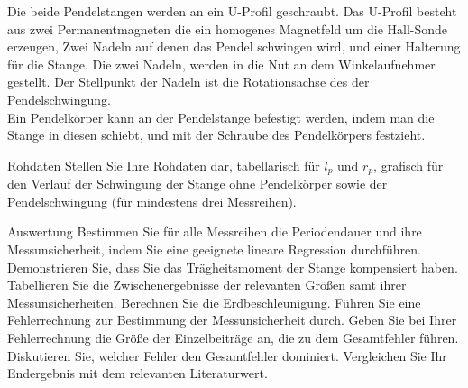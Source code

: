 \documentclass[twoside]{protokoll}
\begin{document}
Die beide Pendelstangen werden an ein U-Profil geschraubt.
Das U-Profil besteht aus zwei Permanentmagneten die ein homogenes Magnetfeld um die Hall-Sonde erzeugen, Zwei Nadeln auf denen das Pendel schwingen wird, und einer Halterung für die Stange. 
Die zwei Nadeln, werden in die Nut an dem Winkelaufnehmer gestellt.
Der Stellpunkt der Nadeln ist die Rotationsachse des der Pendelschwingung. \\

Ein Pendelkörper kann an der Pendelstange befestigt werden, indem man die Stange in diesen schiebt, und mit der Schraube des Pendelkörpers festzieht. 


\begin{aufgabe}{Rohdaten}
  Stellen Sie Ihre Rohdaten dar, tabellarisch für $l_p$ und $r_p$,
  grafisch für den Verlauf der Schwingung der Stange ohne Pendelkörper
  sowie der Pendelschwingung (für mindestens drei Messreihen).
\end{aufgabe}


\begin{aufgabe}{Auswertung}
  Bestimmen Sie für alle Messreihen die Periodendauer und ihre
  Messunsicherheit, indem Sie eine geeignete lineare Regression
  durchführen. Demonstrieren Sie, dass Sie das Trägheitsmoment der
  Stange kompensiert haben. Tabellieren Sie die Zwischenergebnisse
  der relevanten Größen samt ihrer Messunsicherheiten. Berechnen
  Sie die Erdbeschleunigung. Führen Sie eine Fehlerrechnung zur
  Bestimmung der Messunsicherheit durch. Geben Sie bei Ihrer
  Fehlerrechnung die Größe der Einzelbeiträge an, die zu dem
  Gesamtfehler führen. Diskutieren Sie, welcher Fehler den
  Gesamtfehler dominiert. Vergleichen Sie Ihr Endergebnis mit dem
  relevanten Literaturwert.
\end{aufgabe}
\end{document}
